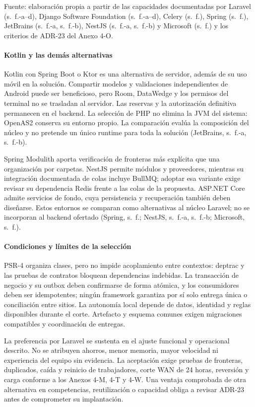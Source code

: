 {\fontsize{9pt}{11pt}\selectfont\raggedright Fuente: elaboración propia a partir de las capacidades documentadas por Laravel (s.~f.-a--d), Django Software Foundation (s.~f.-a--d), Celery (s.~f.), Spring (s.~f.), JetBrains (s.~f.-a, s.~f.-b), NestJS (s.~f.-a, s.~f.-b) y Microsoft (s.~f.) y los criterios de ADR-23 del Anexo 4-O.\par}

\paragraph{Kotlin y las demás alternativas}
Kotlin con Spring Boot o Ktor es una alternativa de servidor, además de su uso móvil en la solución. Compartir modelos y validaciones independientes de Android puede ser beneficioso, pero Room, DataWedge y los permisos del terminal no se trasladan al servidor. Las reservas y la autorización definitiva permanecen en el backend. La selección de PHP no elimina la JVM del sistema: OpenAS2 conserva su entorno propio. La comparación evalúa la composición del núcleo y no pretende un único runtime para toda la solución (JetBrains, s.~f.-a, s.~f.-b).

Spring Modulith aporta verificación de fronteras más explícita que una organización por carpetas. NestJS permite módulos y proveedores, mientras su integración documentada de colas incluye BullMQ; adoptar esa variante exige revisar su dependencia Redis frente a las colas de la propuesta. ASP.NET Core admite servicios de fondo, cuya persistencia y recuperación también deben diseñarse. Estos entornos se comparan como alternativas al núcleo Laravel; no se incorporan al backend ofertado (Spring, s.~f.; NestJS, s.~f.-a, s.~f.-b; Microsoft, s.~f.).

\paragraph{Condiciones y límites de la selección}
PSR-4 organiza clases, pero no impide acoplamiento entre contextos: deptrac y las pruebas de contratos bloquean dependencias indebidas. La transacción de negocio y su outbox deben confirmarse de forma atómica, y los consumidores deben ser idempotentes; ningún framework garantiza por sí solo entrega única o conciliación entre sitios. La autonomía local depende de datos, identidad y reglas disponibles durante el corte. Artefacto y esquema comunes exigen migraciones compatibles y coordinación de entregas.

La preferencia por Laravel se sustenta en el ajuste funcional y operacional descrito. No se atribuyen ahorros, menor memoria, mayor velocidad ni experiencia del equipo sin evidencia. La aceptación exige pruebas de fronteras, duplicados, caída y reinicio de trabajadores, corte WAN de 24 horas, reversión y carga conforme a los Anexos 4-M, 4-T y 4-W. Una ventaja comprobada de otra alternativa en competencias, reutilización o capacidad obliga a revisar ADR-23 antes de comprometer su implantación.

